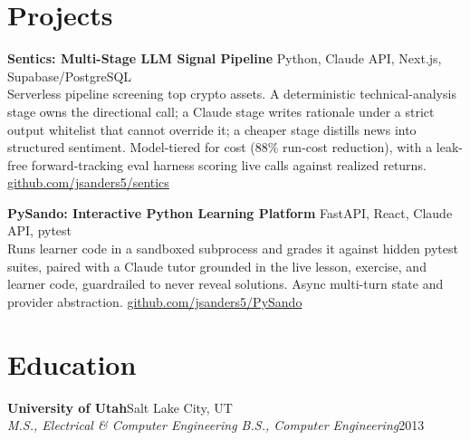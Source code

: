 \documentclass[10.5pt, letterpaper]{article}
\newcommand{\jobentry}[4]{%
  \noindent
  \textbf{\color{accent}#1}\hfill\textcolor{muted}{\small #2}\\
  \textit{#3}\hfill\textcolor{muted}{\small #4}%
}
\begin{document}
\section{Projects}

\noindent\textbf{Sentics: Multi-Stage LLM Signal Pipeline}
\hfill\textcolor{muted}{\small Python, Claude API, Next.js, Supabase/PostgreSQL}\\
Serverless pipeline screening top crypto assets. A deterministic
technical-analysis stage owns the directional call; a Claude stage writes
rationale under a strict output whitelist that cannot override it; a cheaper
stage distills news into structured sentiment. Model-tiered for cost (88\%
run-cost reduction), with a leak-free forward-tracking eval harness scoring
live calls against realized returns.
\hfill\textcolor{muted}{\small\href{https://github.com/jsanders5/sentics}{github.com/jsanders5/sentics}}

\vspace{3pt}

\noindent\textbf{PySando: Interactive Python Learning Platform}
\hfill\textcolor{muted}{\small FastAPI, React, Claude API, pytest}\\
Runs learner code in a sandboxed subprocess and grades it against hidden pytest
suites, paired with a Claude tutor grounded in the live lesson, exercise, and
learner code, guardrailed to never reveal solutions. Async multi-turn state and
provider abstraction.
\hfill\textcolor{muted}{\small\href{https://github.com/jsanders5/PySando}{github.com/jsanders5/PySando}}

\section{Education}

\jobentry{University of Utah}{Salt Lake City, UT}%
  {M.S., Electrical \& Computer Engineering \enspace\textbullet\enspace
   B.S., Computer Engineering}{2013}
\end{document}
